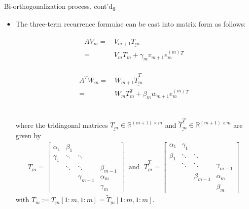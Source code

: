 \documentclass[t,usepdftitle=false]{beamer}
\begin{document}
\begin{frame}{Bi-orthogonalization process, cont'd\textsubscript{6}}
\begin{itemize}
\item The three-term recurrence formulae can be cast into matrix form as follows:\vspace{-.75cm}\\
\begin{minipage}[t]{.45\textwidth}
\begin{align*}
\boxed{
\begin{aligned}
AV_m
=&\,V_{m+1}\underline{T_m}\\
=&\,V_mT_m+\gamma_mv_{m+1}e_{m}^{(m)}{}^T
\end{aligned}
}
\end{align*}
\end{minipage}
\begin{minipage}[t]{.45\textwidth}
\begin{align*}
\boxed{
\begin{aligned}
A^TW_m
=&\,W_{m+1}\underline{\tilde{T}^T_m}\\
=&\,W_mT_m^T+\beta_mw_{m+1}e_{m}^{(m)}{}^T
\end{aligned}
}
\end{align*}
\end{minipage}
\vspace{.25cm}\\
where the tridiagonal matrices $\underline{T_m}\in\mathbb{R}^{(m+1)\times m}$ and $\underline{\tilde{T}^T_m}\in\mathbb{R}^{(m+1)\times m}$ are given by
\begin{align*}
\underline{T_m}=
\begin{bmatrix}
\alpha_1&\beta_1&&\\
\gamma_1&\ddots&\ddots&\\
&\ddots&\ddots&\beta_{m-1}\\
&&\gamma_{m-1}&\alpha_m\\
&&&\gamma_m
\end{bmatrix}
\;\text{ and }\;
\underline{\tilde{T}^{T}_m}=
\begin{bmatrix}
\alpha_1&\gamma_1&&\\
\beta_1&\ddots&\ddots&\\
&\ddots&\ddots&\gamma_{m-1}\\
&&\beta_{m-1}&\alpha_m\\
&&&\beta_m
\end{bmatrix}
\end{align*}
with $T_m:=\underline{T_m}[1:m,1:m]=\underline{\tilde{T}_m}[1:m,1:m]$.
\end{itemize}
\end{frame}
\end{document}
